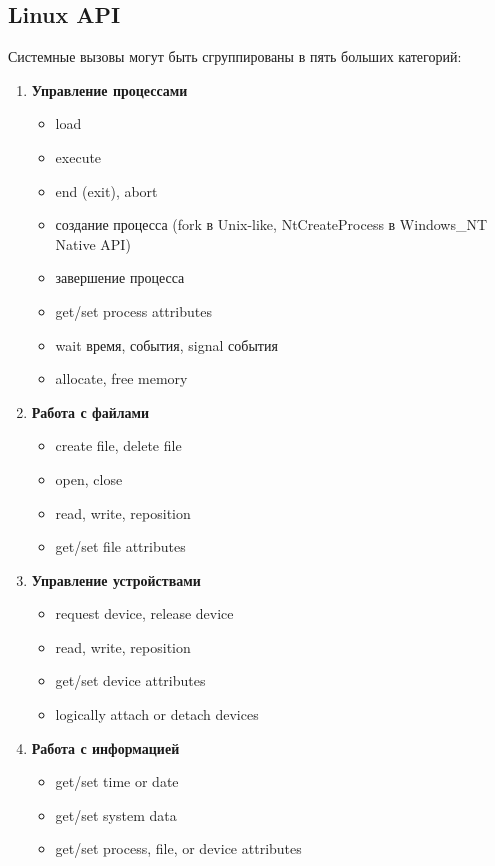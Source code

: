 \documentclass[a4paper, 14pt]{article}
\begin{document}
\subsection{Linux API}

\par Системные вызовы могут быть сгруппированы в пять больших категорий:

\begin{enumerate}
\item \textbf{Управление процессами}

\begin{itemize}
    \item load
    \item execute
    \item end (exit), abort
    \item создание процесса (fork в Unix-like, NtCreateProcess в Windows\_NT Native API)
    \item завершение процесса
    \item get/set process attributes
    \item wait время, события, signal события
    \item allocate, free memory
\end{itemize}

\item \textbf{Работа с файлами}

\begin{itemize}
    \item create file, delete file
    \item open, close
    \item read, write, reposition
    \item get/set file attributes
\end{itemize}

\item \textbf{Управление устройствами}

\begin{itemize}
    \item request device, release device
    \item read, write, reposition
    \item get/set device attributes
    \item logically attach or detach devices
\end{itemize}

\item \textbf{Работа с информацией}

\begin{itemize}
    \item get/set time or date
    \item get/set system data
    \item get/set process, file, or device attributes
\end{itemize}


\end{enumerate}
\end{document}
